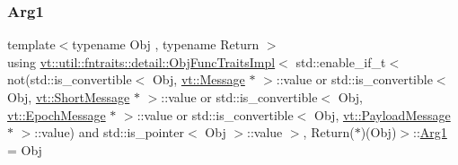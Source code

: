 \subsubsection{\texorpdfstring{Arg1}{Arg1}}
{\footnotesize\ttfamily template$<$typename Obj , typename Return $>$ \\
using \hyperlink{structvt_1_1util_1_1fntraits_1_1detail_1_1_obj_func_traits_impl}{vt\+::util\+::fntraits\+::detail\+::\+Obj\+Func\+Traits\+Impl}$<$ std\+::enable\+\_\+if\+\_\+t$<$ not(std\+::is\+\_\+convertible$<$ Obj, \hyperlink{namespacevt_a3a3ddfef40b4c90915fa43cdd5f129ea}{vt\+::\+Message} $\ast$ $>$\+::value or std\+::is\+\_\+convertible$<$ Obj, \hyperlink{namespacevt_a1125ac1da6c0bbf141e0ea0739d7602d}{vt\+::\+Short\+Message} $\ast$ $>$\+::value or std\+::is\+\_\+convertible$<$ Obj, \hyperlink{namespacevt_ad67368ffae52d7325002586b41bb150e}{vt\+::\+Epoch\+Message} $\ast$ $>$\+::value or std\+::is\+\_\+convertible$<$ Obj, \hyperlink{namespacevt_a89a92229c5622b855c02c549f83a1a68}{vt\+::\+Payload\+Message} $\ast$ $>$\+::value) and std\+::is\+\_\+pointer$<$ Obj $>$\+::value $>$, Return($\ast$)(Obj)$>$\+::\hyperlink{structvt_1_1util_1_1fntraits_1_1detail_1_1_obj_func_traits_impl_3_01std_1_1enable__if__t_3_01not8a3cf894b8afc41bf28f29f3b0ac693f_a993f20b53845642e3605ccd1dcc8cd21}{Arg1} =  Obj}

